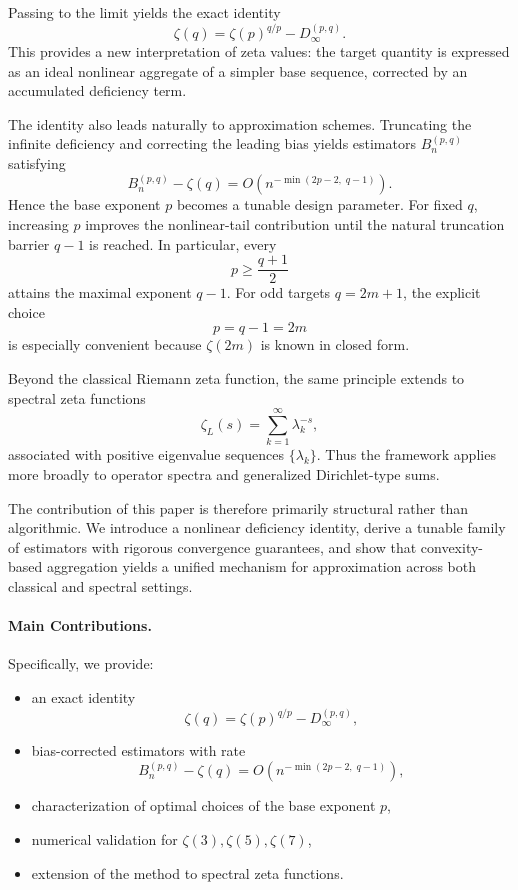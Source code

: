 \documentclass[11pt]{article}
\numberwithin{equation}{section}
\theoremstyle{definition}
\begin{document}
Passing to the limit yields the exact identity
\[
\zeta(q)=\zeta(p)^{q/p}-D_\infty^{(p,q)}.
\]
This provides a new interpretation of zeta values: the target quantity is expressed as an ideal nonlinear aggregate of a simpler base sequence, corrected by an accumulated deficiency term.

The identity also leads naturally to approximation schemes. Truncating the infinite deficiency and correcting the leading bias yields estimators \(B_n^{(p,q)}\) satisfying
\[
B_n^{(p,q)}-\zeta(q)
=
O\!\left(n^{-\min(2p-2,\;q-1)}\right).
\]
Hence the base exponent \(p\) becomes a tunable design parameter. For fixed \(q\), increasing \(p\) improves the nonlinear-tail contribution until the natural truncation barrier \(q-1\) is reached. In particular, every
\[
p\ge \frac{q+1}{2}
\]
attains the maximal exponent \(q-1\). For odd targets \(q=2m+1\), the explicit choice
\[
p=q-1=2m
\]
is especially convenient because \(\zeta(2m)\) is known in closed form.

Beyond the classical Riemann zeta function, the same principle extends to spectral zeta functions
\[
\zeta_L(s)=\sum_{k=1}^{\infty}\lambda_k^{-s},
\]
associated with positive eigenvalue sequences \(\{\lambda_k\}\). Thus the framework applies more broadly to operator spectra and generalized Dirichlet-type sums.

The contribution of this paper is therefore primarily structural rather than algorithmic. We introduce a nonlinear deficiency identity, derive a tunable family of estimators with rigorous convergence guarantees, and show that convexity-based aggregation yields a unified mechanism for approximation across both classical and spectral settings.

\paragraph{Main Contributions.}
Specifically, we provide:

\begin{itemize}
\item an exact identity
\[
\zeta(q)=\zeta(p)^{q/p}-D_\infty^{(p,q)},
\]

\item bias-corrected estimators with rate
\[
B_n^{(p,q)}-\zeta(q)=O\!\left(n^{-\min(2p-2,\;q-1)}\right),
\]

\item characterization of optimal choices of the base exponent \(p\),

\item numerical validation for \(\zeta(3),\zeta(5),\zeta(7)\),

\item extension of the method to spectral zeta functions.
\end{itemize}
\end{document}
